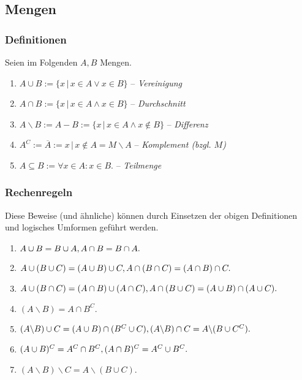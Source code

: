 \documentclass[a4paper, 9pt, DIV=24]{scrartcl}
\begin{document}
\subsection{Mengen}
\subsubsection{Definitionen}
Seien im Folgenden $A, B$ Mengen.
\begin{enumerate}[label={(}\arabic*{)}]
 \item $A \cup B := \{x\, |\, x \in A \lor x \in B\}$ -- \emph{Vereinigung}
 \item $A \cap B := \{x\, |\, x \in A \land x \in B\}$ -- \emph{Durchschnitt}
 \item $A \backslash B := A - B := \{x\, |\, x \in A \wedge x \notin B\}$ -- \emph{Differenz}
 \item $A^C := \overline{A} := {x\, |\, x \notin A} = M \backslash A$ -- \emph{Komplement (bzgl. $M$)}
 \item $A \subseteq B := \forall x \in A: x \in B.$ -- \emph{Teilmenge}
\end{enumerate}
\subsubsection{Rechenregeln}
Diese Beweise (und ähnliche) können durch Einsetzen der obigen Definitionen und logisches Umformen geführt werden.
\begin{enumerate}[label={(}\arabic*{)}]
 \item $A \cup B = B \cup A, \\ A \cap B = B \cap A.$
 \item $A \cup (B \cup C) = (A \cup B) \cup C, \\ A \cap (B \cap C) = (A \cap B) \cap C.$
 \item $A \cup (B \cap C) = (A \cap B) \cup (A \cap C), \\ A \cap (B \cup C) = (A \cup B) \cap (A \cup C).$
 \item $(A\backslash B) = A \cap B^C.$
 \item $(A\backslash B) \cup C = (A \cup B) \cap (B^C \cup C), \\ (A\backslash B) \cap C = A \backslash (B \cup C^C).$
 \item $(A \cup B)^C = A^C \cap B^C, \\ (A \cap B)^C = A^C \cup B^C.$
 \item $(A\backslash B) \backslash C = A \backslash (B \cup C).$
\end{enumerate}
\end{document}
